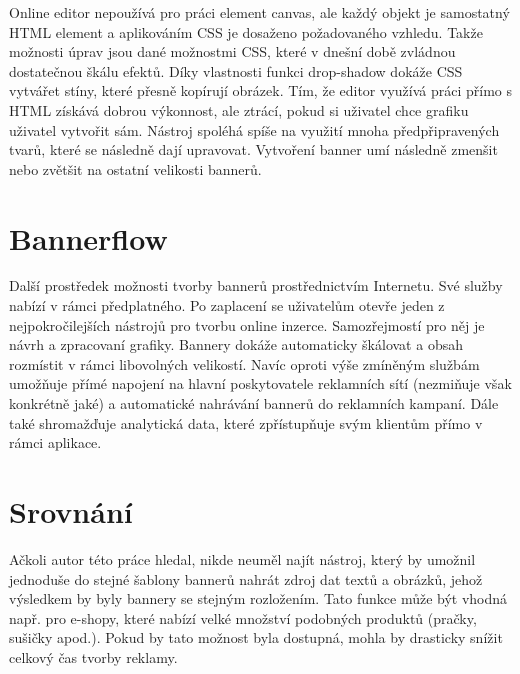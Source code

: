 Online editor nepoužívá pro práci element canvas, ale každý objekt je samostatný HTML element a aplikováním CSS je dosaženo požadovaného vzhledu.
Takže možnosti úprav jsou dané možnostmi CSS, které v dnešní době zvládnou dostatečnou škálu efektů.
Díky vlastnosti funkci drop-shadow dokáže CSS vytvářet stíny, které přesně kopírují obrázek.
Tím, že editor využívá práci přímo s HTML získává dobrou výkonnost, ale ztrácí, pokud si uživatel chce grafiku uživatel vytvořit sám.
Nástroj spoléhá spíše na využití mnoha předpřipravených tvarů, které se následně dají upravovat. Vytvoření banner umí následně zmenšit nebo
zvětšit na ostatní velikosti bannerů.

\section{Bannerflow}
Další prostředek možnosti tvorby bannerů prostřednictvím Internetu. Své služby nabízí v rámci předplatného.
Po zaplacení se uživatelům otevře jeden z nejpokročilejších nástrojů pro tvorbu online inzerce.
Samozřejmostí pro něj je návrh a zpracovaní grafiky. Bannery dokáže automaticky škálovat a obsah rozmístit v rámci libovolných velikostí.
Navíc oproti výše zmíněným službám umožňuje přímé napojení na hlavní poskytovatele reklamních sítí (nezmiňuje však konkrétně jaké) a
automatické nahrávání bannerů do reklamních kampaní. Dále také shromažďuje analytická data, které zpřístupňuje svým klientům přímo v rámci aplikace.

\section{Srovnání}
Ačkoli autor této práce hledal, nikde neuměl najít nástroj, který by umožnil jednoduše do stejné šablony bannerů nahrát zdroj dat textů a obrázků,
jehož výsledkem by byly bannery se stejným rozložením. Tato funkce může být vhodná např. pro e-shopy,
které nabízí velké množství podobných produktů (pračky, sušičky apod.). Pokud by tato možnost byla dostupná,
mohla by drasticky snížit celkový čas tvorby reklamy. 



\endinput